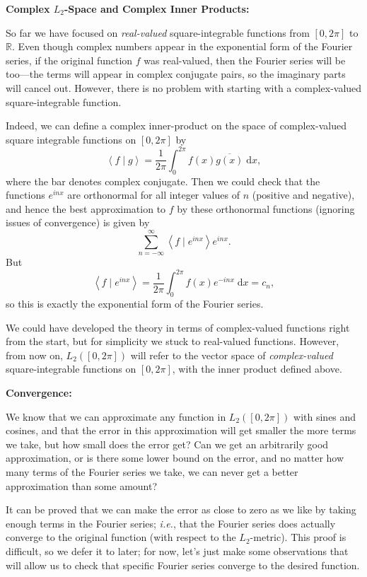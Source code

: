 \documentclass{article}
\newcommand{\diff}{\;\mathrm{d}}
\newcommand{\braket}[2]{\left\langle #1 \mid #2 \right\rangle}
\begin{document}
\clearpage



\textbf{Complex $L_2$-Space and Complex Inner Products:}\bigskip


So far we have focused on \textit{real-valued} square-integrable functions from $[0,2\pi]$ to $\mathbb{R}$. Even though complex numbers appear in the exponential form of the Fourier series, if the original function $f$ was real-valued, then the Fourier series will be too---the terms will appear in complex conjugate pairs, so the imaginary parts will cancel out. However, there is no problem with starting with a complex-valued square-integrable function.

Indeed, we can define a complex inner-product on the space of complex-valued square integrable functions on $[0,2\pi]$ by
\[\braket{f}{g}=\frac{1}{2\pi}\int_0^{2\pi} f(x)\overline{g(x)}\diff x,\]
where the bar denotes complex conjugate. Then we could check that the functions $e^{inx}$ are orthonormal for all integer values of $n$ (positive and negative), and hence the best approximation to $f$ by these orthonormal functions (ignoring issues of convergence) is given by
\[\sum_{n=-\infty}^\infty \braket{f}{e^{inx}}e^{inx}.\]
But
\[\braket{f}{e^{inx}}=\frac{1}{2\pi}\int_0^{2\pi} f(x)e^{-inx}\diff x=c_n,\]
so this is exactly the exponential form of the Fourier series.\bigskip

We could have developed the theory in terms of complex-valued functions right from the start, but for simplicity we stuck to real-valued functions. However, from now on, $L_2([0,2\pi])$ will refer to the vector space of \textit{complex-valued} square-integrable functions on $[0,2\pi]$, with the inner product defined above.







\clearpage



\textbf{Convergence:}\bigskip


We know that we can approximate any function in $L_2([0,2\pi])$ with sines and cosines, and that the error in this approximation will get smaller the more terms we take, but how small does the error get? Can we get an arbitrarily good approximation, or is there some lower bound on the error, and no matter how many terms of the Fourier series we take, we can never get a better approximation than some amount?

It can be proved that we can make the error as close to zero as we like by taking enough terms in the Fourier series; \textit{i.e.}, that the Fourier series does actually converge to the original function (with respect to the $L_2$-metric). This proof is difficult, so we defer it to later; for now, let's just make some observations that will allow us to check that specific Fourier series converge to the desired function.
\end{document}
